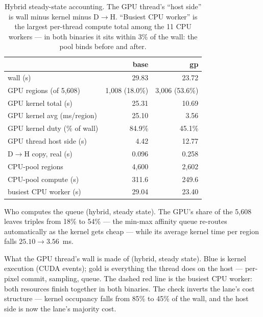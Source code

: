 \documentclass[
	english,
	letterpaper, oneside
]{article}
\begin{document}
\begin{table}[H]
\centering
\caption{Hybrid steady-state accounting. The GPU thread's ``host side''
is wall minus kernel minus D$\to$H. ``Busiest CPU worker'' is the largest
per-thread compute total among the 11 CPU workers --- in both binaries it
sits within 3\% of the wall: the pool binds before and after.}
\label{tab:hybrid}
\small
\begin{tabular}{lrr}
\toprule
 & base & gp \\
\midrule
wall (s)                     & 29.83 & 23.72 \\
GPU regions (of 5{,}608)     & 1{,}008 (18.0\%) & 3{,}006 (53.6\%) \\
GPU kernel total (s)         & 25.31 & 10.69 \\
GPU kernel avg (ms/region)   & 25.10 & 3.56 \\
GPU kernel duty (\% of wall) & 84.9\% & 45.1\% \\
GPU thread host side (s)     & 4.42 & 12.77 \\
D$\to$H copy, real (s)       & 0.096 & 0.258 \\
CPU-pool regions             & 4{,}600 & 2{,}602 \\
CPU-pool compute (s)         & 311.6 & 249.6 \\
busiest CPU worker (s)       & 29.04 & 23.40 \\
\bottomrule
\end{tabular}
\end{table}

            {Who computes the queue (hybrid, steady state). The GPU's share
             of the 5{,}608 leaves triples from 18\% to 54\% --- the min-max
             affinity queue re-routes automatically as the kernel gets
             cheap --- while its average kernel time per region falls
             $25.10 \to 3.56$~ms. \label{fig:share}}

            {What the GPU thread's wall is made of (hybrid, steady state).
             Blue is kernel execution (CUDA events); gold is everything the
             thread does on the host --- per-pixel commit, sampling, queue.
             The dashed red line is the busiest CPU worker: both resources
             finish together in both binaries. The check inverts the lane's
             cost structure --- kernel occupancy falls from 85\% to 45\% of
             the wall, and the host side is now the lane's majority
             cost. \label{fig:lane}}
\end{document}
